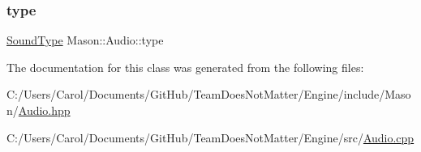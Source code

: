 \subsubsection{\texorpdfstring{type}{type}}
{\footnotesize\ttfamily \hyperlink{namespace_mason_a158d651086d1ba1aacc4c37125b27657}{Sound\+Type} Mason\+::\+Audio\+::type}



The documentation for this class was generated from the following files\+:\begin{DoxyCompactItemize}
\item 
C\+:/\+Users/\+Carol/\+Documents/\+Git\+Hub/\+Team\+Does\+Not\+Matter/\+Engine/include/\+Mason/\hyperlink{_audio_8hpp}{Audio.\+hpp}\item 
C\+:/\+Users/\+Carol/\+Documents/\+Git\+Hub/\+Team\+Does\+Not\+Matter/\+Engine/src/\hyperlink{_audio_8cpp}{Audio.\+cpp}\end{DoxyCompactItemize}
